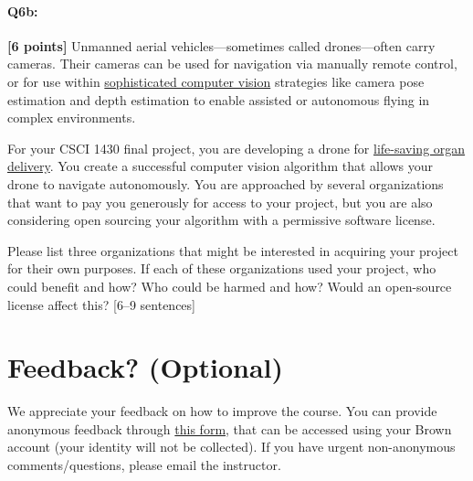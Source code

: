 \pagebreak
\paragraph{Q6b:} \textbf{[6 points]} Unmanned aerial vehicles---sometimes called drones---often carry cameras. Their cameras can be used for navigation via manually remote control, or for use within \href{https://link.springer.com/article/10.1007/s10846-017-0483-z}{sophisticated computer vision} strategies like camera pose estimation and depth estimation to enable assisted or autonomous flying in complex environments.

For your CSCI 1430 final project, you are developing a drone for \href{https://www.cnn.com/2019/05/01/health/drone-organ-transplant-bn-trnd/index.html}{life-saving organ delivery}. You create a successful computer vision algorithm that allows your drone to navigate autonomously. You are approached by several organizations that want to pay you generously for access to your project, but you are also considering open sourcing your algorithm with a permissive software license.

\begin{tcolorbox}[colback=orange!5!white,colframe=orange!75!black]
Please list three organizations that might be interested in acquiring your project for their own purposes. If each of these organizations used your project, who could benefit and how? Who could be harmed and how? Would an open-source license affect this? [6–9 sentences]
\end{tcolorbox}


\pagebreak
\section*{Feedback? (Optional)}
We appreciate your feedback on how to improve the course. You can provide anonymous feedback through \href{https://forms.gle/uwBwicWfkYH9v6BU6}{this form}, that can be accessed using your Brown account (your identity will not be collected). If you have urgent non-anonymous comments/questions, please email the instructor.




